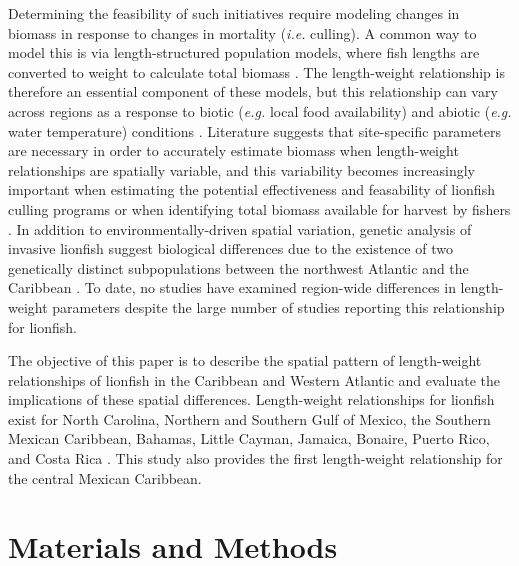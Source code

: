\documentclass[fleqn,10pt,lineno]{wlpeerj} %
\begin{document}
Determining the feasibility of such initiatives require modeling changes
in biomass in response to changes in mortality (\emph{i.e.} culling). A
common way to model this is via length-structured population models,
where fish lengths are converted to weight to calculate total biomass
\citep{cote_2014,barbour_2011,andradibrown_2017}. The length-weight
relationship is therefore an essential component of these models, but
this relationship can vary across regions as a response to biotic
(\emph{e.g.} local food availability) and abiotic (\emph{e.g.} water
temperature) conditions \citep{johnson_2016}. Literature suggests that
site-specific parameters are necessary in order to accurately estimate
biomass when length-weight relationships are spatially variable, and
this variability becomes increasingly important when estimating the
potential effectiveness and feasability of lionfish culling programs or
when identifying total biomass available for harvest by fishers
\citep{barbour_2011,morris_2011,johnston_2015,chin_2016,cote_2014}. In
addition to environmentally-driven spatial variation, genetic analysis
of invasive lionfish suggest biological differences due to the existence
of two genetically distinct subpopulations between the northwest
Atlantic and the Caribbean \citep{betancurr_2011}. To date, no studies
have examined region-wide differences in length-weight parameters
despite the large number of studies reporting this relationship for
lionfish.

The objective of this paper is to describe the spatial pattern of
length-weight relationships of lionfish in the Caribbean and Western
Atlantic and evaluate the implications of these spatial differences.
Length-weight relationships for lionfish exist for North Carolina,
Northern and Southern Gulf of Mexico, the Southern Mexican Caribbean,
Bahamas, Little Cayman, Jamaica, Bonaire, Puerto Rico, and Costa Rica
\citep{barbour_2011,fogg_2013,dahl_2014,aguilarperera_2016,sabidoitza_2016,sabidoitz_2016,darling_2011,edwards_2014,chin_2016,deleon_2013,toledohernndez_2014,sandel_2015}.
This study also provides the first length-weight relationship for the
central Mexican Caribbean.

\clearpage

\section*{Materials and Methods}
\end{document}
